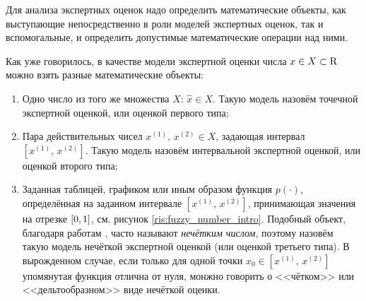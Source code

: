 
\label{sec:math_methods_global}


Для анализа экспертных оценок надо определить математические объекты, как выступающие непосредственно в роли моделей экспертных оценок, так и вспомогальные, и определить допустимые математические операции над ними. 

Как уже говорилось, в качестве модели экспертной оценки числа $x \in X \subset {\mathrm{R}}$ можно взять разные математические объекты: %
\begin{enumerate}
  \item Одно число из того же множества $X$: $\hat{x} \in X$. Такую модель назовём точечной экспертной оценкой, или оценкой первого типа;
  \item Пара действительных чисел $x^{(1)},\, x^{(2)} \in X$, задающая интервал $[x^{(1)},\, x^{(2)}]$. Такую модель назовём интервальной экспертной оценкой, или оценкой второго типа;
  \item Заданная таблицей, графиком или иным образом функция $p(\cdot)$, определённая на заданном интервале $[x^{(1)},\, x^{(2)}]$, принимающая значения на отрезке $[0,1]$, см. рисунок \ref{ris:fuzzy_number_intro}.  Подобный объект, благодаря работам \cite{citeZadeh, dubois_prade-1990}, часто называют {\sl нечётким числом}, поэтому назовём такую модель нечёткой экспертной оценкой (или оценкой третьего типа). В вырожденном случае, если только для одной точки $x_0 \in [x^{(1)},\, x^{(2)}]$ упомянутая функция отлична от нуля, монжно говорить о <<чётком>> или <<дельтообразном>> виде нечёткой оценки. 
\end{enumerate}

